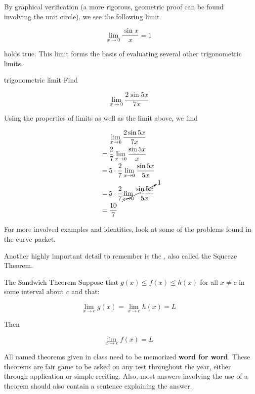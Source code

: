 By graphical verification (a more rigorous, geometric proof can be found involving the unit circle), we see the following limit

\[ \lim_{x \to 0} \dfrac{\sin{x}}{x} = 1 \]

holds true. This limit forms the basis of evaluating several other trigonometric limits.

\begin{example}{trigonometric limit}
    Find
    
    \[ \lim_{x \to 0} \dfrac{2 \sin{5x}}{7x} \]
    
    Using the properties of limits as well as the limit above, we find
    
    \begin{align}
        &\lim_{x \to 0} \dfrac{2 \sin{5x}}{7x} \\
        = \> &\dfrac{2}{7} \lim_{x \to 0} \dfrac{\sin{5x}}{x} \\
        = \> & 5 \cdot \dfrac{2}{7} \lim_{x \to 0} \dfrac{\sin{5x}}{5x} \\
        = \> & 5 \cdot \dfrac{2}{7} \cancelto{1}{\lim_{x \to 0} \dfrac{\sin{5x}}{5x}} \\
        = \> & \dfrac{10}{7}
    \end{align}
\end{example}

For more involved examples and identities, look at some of the problems found in the curve packet.

\vspace{0.5cm}

Another highly important detail to remember is the , also called the Squeeze Theorem.

\begin{theorem}{The Sandwich Theorem}
    Suppose that \( g \left( x \right) \le f \left( x \right) \le h \left( x \right) \) for all \( x \ne c \) in some interval about \( c \) and that:
    
    \[ \lim_{x \to c} g \left( x \right) = \lim_{x \to c} h \left( x \right) = L \]
    
    Then
    
    \[ \lim_{x \to c} f \left( x \right) = L \]
\end{theorem}

\begin{tip}
    All named theorems given in class need to be memorized \textbf{word for word}. These theorems are fair game to be asked on any test throughout the year, either through application or simple reciting. Also, most answers involving the use of a theorem should also contain a sentence explaining the answer.
\end{tip}

